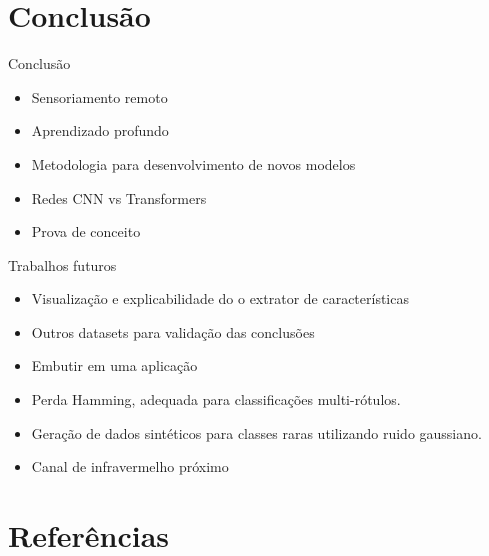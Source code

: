 \documentclass[8pt]{beamer}
\begin{document}
\section{Conclusão} 
\begin{frame}{Conclusão}
    \begin{itemize}
        \item Sensoriamento remoto
        \item Aprendizado profundo
        \item Metodologia para desenvolvimento de novos modelos
        \item Redes CNN vs Transformers
        \item Prova de conceito 
    \end{itemize}


    
\end{frame}    

\begin{frame}{Trabalhos futuros}
    \fontsize{7pt}{8pt}\selectfont
\begin{itemize}
    \item Visualização e explicabilidade do o extrator de características
    \item Outros datasets para validação das conclusões
    \item Embutir em uma aplicação
    \item Perda Hamming, adequada para classificações multi-rótulos.
    \item Geração de dados sintéticos para classes raras utilizando ruido gaussiano.
    \item Canal de infravermelho próximo
\end{itemize}
\end{frame}

\section{Referências} 
\fontsize{6pt}{7pt}\selectfont

\end{document}
